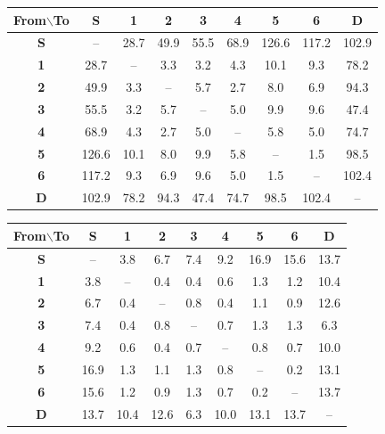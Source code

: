 \begin{table}[t]
	\centering
	\resizebox{\columnwidth}{!}
	{
		\begin{tabular}{c|cccccccc}
			\toprule
			\textbf{From$\backslash$To} & \textbf{S} & \textbf{1} & \textbf{2} & \textbf{3} & \textbf{4} & \textbf{5} & \textbf{6} & \textbf{D} \\
			\midrule
			\textbf{S} & --    & 28.7  & 49.9  & 55.5  & 68.9  & 126.6 & 117.2 & 102.9 \\
			\textbf{1} & 28.7  & --    & 3.3   & 3.2   & 4.3   & 10.1  & 9.3   & 78.2  \\
			\textbf{2} & 49.9  & 3.3   & --    & 5.7   & 2.7   & 8.0   & 6.9   & 94.3  \\
			\textbf{3} & 55.5  & 3.2   & 5.7   & --    & 5.0   & 9.9   & 9.6   & 47.4  \\
			\textbf{4} & 68.9  & 4.3   & 2.7   & 5.0   & --    & 5.8   & 5.0   & 74.7  \\
			\textbf{5} & 126.6 & 10.1  & 8.0   & 9.9   & 5.8   & --    & 1.5   & 98.5  \\
			\textbf{6} & 117.2 & 9.3   & 6.9   & 9.6   & 5.0   & 1.5   & --    & 102.4 \\
			\textbf{D} & 102.9 & 78.2  & 94.3  & 47.4  & 74.7  & 98.5  & 102.4 & --    \\
			\bottomrule
		\end{tabular}
	}
	\label{tab:example_walk}
\end{table}

\begin{table}[t]
	\centering
	\resizebox{0.97\columnwidth}{!}
	{
		\begin{tabular}{c|cccccccc}
			\toprule
			\textbf{From$\backslash$To} & \textbf{S} & \textbf{1} & \textbf{2} & \textbf{3} & \textbf{4} & \textbf{5} & \textbf{6} & \textbf{D} \\
			\midrule
			\textbf{S} & --    & 3.8  & 6.7  & 7.4  & 9.2  & 16.9 & 15.6 & 13.7 \\
			\textbf{1} & 3.8   & --   & 0.4  & 0.4  & 0.6  & 1.3  & 1.2  & 10.4 \\
			\textbf{2} & 6.7   & 0.4  & --   & 0.8  & 0.4  & 1.1  & 0.9  & 12.6 \\
			\textbf{3} & 7.4   & 0.4  & 0.8  & --   & 0.7  & 1.3  & 1.3  & 6.3  \\
			\textbf{4} & 9.2   & 0.6  & 0.4  & 0.7  & --   & 0.8  & 0.7  & 10.0 \\
			\textbf{5} & 16.9  & 1.3  & 1.1  & 1.3  & 0.8  & --   & 0.2  & 13.1 \\
			\textbf{6} & 15.6  & 1.2  & 0.9  & 1.3  & 0.7  & 0.2  & --   & 13.7 \\
			\textbf{D} & 13.7  & 10.4 & 12.6 & 6.3  & 10.0 & 13.1 & 13.7 & --   \\
			\bottomrule
		\end{tabular}
	}
	\label{tab:example_taxi}
\end{table}


